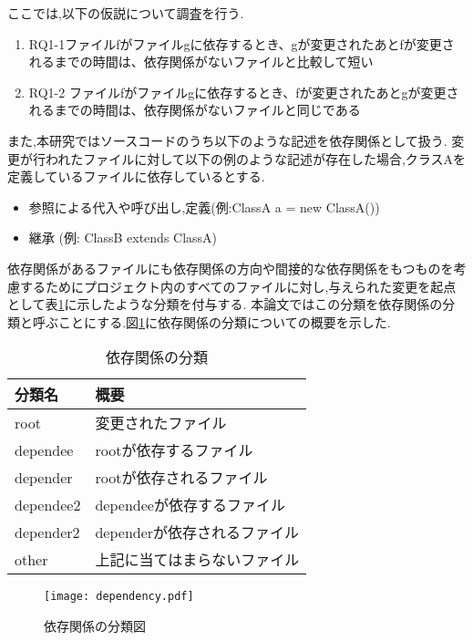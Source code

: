 \documentclass{fose2016}           %
\begin{document}
ここでは,以下の仮説について調査を行う.
\begin{enumerate}
\item RQ1-1ファイルfがファイルgに依存するとき、gが変更されたあとfが変更されるまでの時間は、依存関係がないファイルと比較して短い
\item RQ1-2 ファイルfがファイルgに依存するとき、fが変更されたあとgが変更されるまでの時間は、依存関係がないファイルと同じである
\end{enumerate}

また,本研究ではソースコードのうち以下のような記述を依存関係として扱う.
変更が行われたファイルに対して以下の例のような記述が存在した場合,クラスAを定義しているファイルに依存しているとする.

\begin{itemize}
\item 参照による代入や呼び出し,定義(例:ClassA a = new ClassA())
\item 継承 (例: ClassB extends ClassA)
\end{itemize}

依存関係があるファイルにも依存関係の方向や間接的な依存関係をもつものを考慮するためにプロジェクト内のすべてのファイルに対し,与えられた変更を起点として表\ref{tab:依存関係の分類}に示したような分類を付与する.
本論文ではこの分類を依存関係の分類と呼ぶことにする.図\ref{fig:dependency}に依存関係の分類についての概要を示した.

\begin{table}
\begin{center}
\caption{依存関係の分類}
\begin{tabular}{|l|l|} \hline
分類名 & 概要 \\ \hline
root & 変更されたファイル \\ \hline
dependee & rootが依存するファイル \\ \hline
depender & rootが依存されるファイル \\ \hline
dependee2 & dependeeが依存するファイル \\ \hline
depender2 & dependerが依存されるファイル \\ \hline
other & 上記に当てはまらないファイル \\ \hline
\end{tabular}
\end{center}
\label{tab:依存関係の分類}
\end{table}

\begin{figure}[t]
\centering
\texttt{[image: dependency.pdf]}
\caption{依存関係の分類図}
\label{fig:dependency} 
\end{figure}
\end{document}
